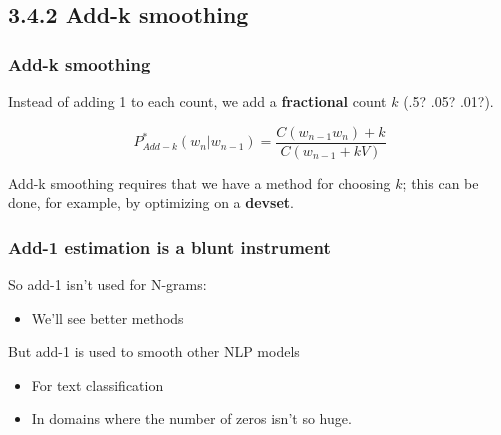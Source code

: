 \documentclass[13.5pt,aspecratio=169]{beamer}
\begin{document}
\subsection{3.4.2 Add-k smoothing}
\begin{frame}
    \onehalfspacing
        \frametitle{Add-k smoothing}
        {\Large Instead of adding 1 to each count, we add a \textbf{fractional} count $k$ (.5? .05? .01?). } \vspace{-2em}

        \begin{center} 
            \[ P^*_{Add-k} (w_n | w_{n-1}) = \frac{C(w_{n-1} w_n) + k}{C(w_{n-1} + kV)} \]
          \end{center}

       \begin{block}{}
        Add-k smoothing requires that we have a method for choosing $k$; this can be done, for example, by optimizing on a \textbf{devset}.

       \end{block}
    \end{frame}
    


\begin{frame}
\onehalfspacing
	\frametitle{Add-1 estimation is a blunt instrument}
    {\Large So add-1 isn’t used for N-grams:}
    \begin{itemize}
        \item {\large We’ll see better methods}

    \end{itemize}
    \vspace{3em}
    {\Large But add-1 is used to smooth other NLP models}
    \begin{itemize}
        \item {\large For text classification}
        \item {\large In domains where the number of zeros isn’t so huge.}
    \end{itemize}

   
\end{frame}

\end{document}
